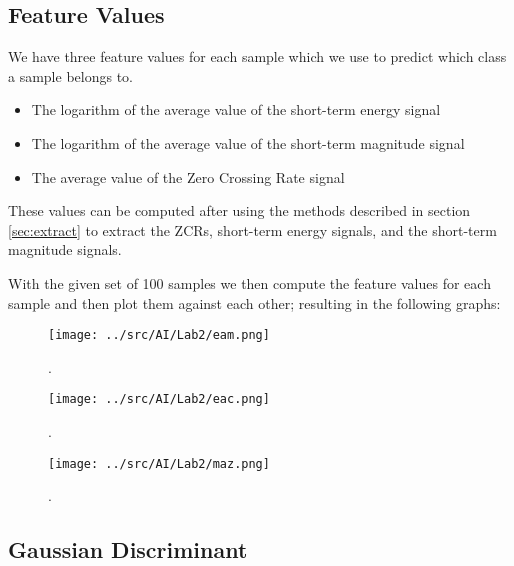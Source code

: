 \documentclass[a4paper]{article}
\begin{document}
\subsection{Feature Values}

We have three feature values for each sample which we use to predict which class a sample belongs to.
\begin{itemize}
\item The logarithm of the average value of the short-term energy signal
\item The logarithm of the average value of the short-term magnitude signal
\item The average value of the Zero Crossing Rate signal
\end{itemize}

These values can be computed after using the methods described in section \ref{sec:extract}
to extract the ZCRs, short-term energy signals, and the short-term magnitude signals.

With the given set of 100 samples we then compute the feature values for each sample
and then plot them against each other; resulting in the following graphs:

\begin{figure}[H]
\begin{center}
\texttt{[image: ../src/AI/Lab2/eam.png]}
\caption{.}
\label{plot1}
\end{center}
\end{figure}


\begin{figure}[H]
\begin{center}
\texttt{[image: ../src/AI/Lab2/eac.png]}
\caption{.}
\label{plot2}
\end{center}
\end{figure}


\begin{figure}[H]
\begin{center}
\texttt{[image: ../src/AI/Lab2/maz.png]}
\caption{.}
\label{plot3}
\end{center}
\end{figure}


\subsection{Gaussian Discriminant} \label{sec:gauss}
\end{document}
